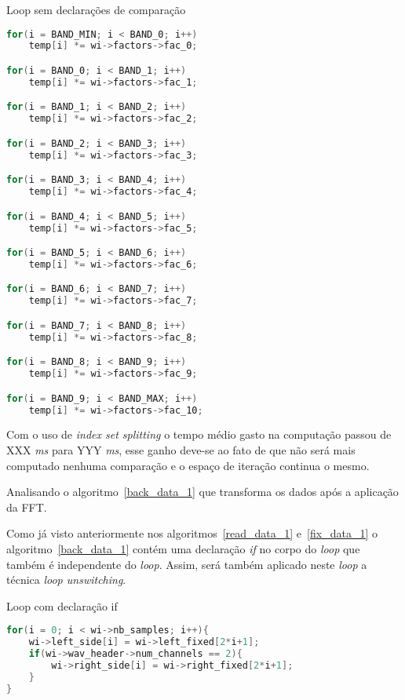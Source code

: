 \begin{algorithm}
\caption{Loop sem declarações de comparação}
\label{equalize_2}
\begin{lstlisting}[language=c]
for(i = BAND_MIN; i < BAND_0; i++)
    temp[i] *= wi->factors->fac_0;

for(i = BAND_0; i < BAND_1; i++)
    temp[i] *= wi->factors->fac_1;

for(i = BAND_1; i < BAND_2; i++)
    temp[i] *= wi->factors->fac_2;

for(i = BAND_2; i < BAND_3; i++)
    temp[i] *= wi->factors->fac_3;

for(i = BAND_3; i < BAND_4; i++)
    temp[i] *= wi->factors->fac_4;

for(i = BAND_4; i < BAND_5; i++)
    temp[i] *= wi->factors->fac_5;

for(i = BAND_5; i < BAND_6; i++)
    temp[i] *= wi->factors->fac_6;

for(i = BAND_6; i < BAND_7; i++)
    temp[i] *= wi->factors->fac_7;

for(i = BAND_7; i < BAND_8; i++)
    temp[i] *= wi->factors->fac_8;

for(i = BAND_8; i < BAND_9; i++)
    temp[i] *= wi->factors->fac_9;

for(i = BAND_9; i < BAND_MAX; i++)
    temp[i] *= wi->factors->fac_10;
\end{lstlisting}
\end{algorithm}

Com o uso de \textit{index set splitting} o tempo médio gasto na computação
passou de XXX \textit{ms} para YYY \textit{ms}, esse ganho deve-se ao fato de
que não será mais computado nenhuma comparação e o espaço de iteração continua o
mesmo.


Analisando o algoritmo~\ref{back_data_1} que transforma os dados após a
aplicação da FFT.

Como já visto anteriormente nos algoritmos~\ref{read_data_1} e~\ref{fix_data_1}
o algoritmo~\ref{back_data_1} contém uma declaração \textit{if} no corpo do
\textit{loop} que também é independente do \textit{loop}. Assim, será também
aplicado neste \textit{loop} a técnica \textit{loop unswitching}.

\begin{algorithm}
\caption{Loop com declaração if }
\label{back_data_1}
\begin{lstlisting}[language=c]
for(i = 0; i < wi->nb_samples; i++){
    wi->left_side[i] = wi->left_fixed[2*i+1]; 
    if(wi->wav_header->num_channels == 2){
        wi->right_side[i] = wi->right_fixed[2*i+1]; 
    }
}
\end{lstlisting}
\end{algorithm}

